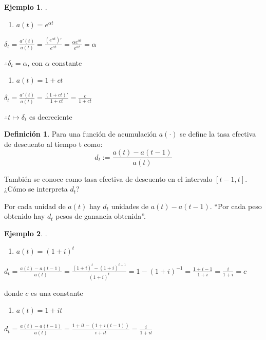 \documentclass[
]{book}
\providecommand{\tightlist}{%
  \setlength{\itemsep}{0pt}\setlength{\parskip}{0pt}}
\theoremstyle{definition}
\newtheorem{definition}{Definición}[chapter]
\theoremstyle{definition}
\newtheorem{example}{Ejemplo}[chapter]
\theoremstyle{definition}
\theoremstyle{definition}
\theoremstyle{remark}
\begin{document}
\begin{example}
.

\begin{enumerate}
\def\labelenumi{\arabic{enumi}.}
\tightlist
\item
  \(a(t)=e^{\alpha t}\)
\end{enumerate}

\(\delta_t = \frac{a'(t)}{a(t)} = \frac{\left( e^{\alpha t}\right)'}{e^{\alpha t}} = \frac{\alpha e^{\alpha t}}{e^{\alpha t}} = \alpha\)

\(\therefore \delta_t = \alpha\), con \(\alpha\) constante

\begin{enumerate}
\def\labelenumi{\arabic{enumi}.}
\setcounter{enumi}{1}
\tightlist
\item
  \(a(t) = 1+ct\)
\end{enumerate}

\(\delta_t = \frac{a'(t)}{a(t)} = \frac{\left( 1+ct\right)'}{1+ct} = \frac{c}{1+ct}\)

\(\therefore t\longmapsto \delta_t\) es decreciente
\end{example}

\begin{definition}
Para una función de acumulación \(a(\cdot )\) se define la {tasa efectiva de descuento al tiempo t} como:
\begin{equation*}
\boxed{d_t := \frac{a(t)-a(t-1)}{a(t)}}
\end{equation*}
\end{definition}

También se conoce como tasa efectiva de descuento en el intervalo \(\left[ t-1, t\right]\). ¿Cómo se interpreta \(d_t\)?

Por cada unidad de \(a(t)\) hay \(d_t\) unidades de \(a(t)-a(t-1)\). ``Por cada peso obtenido hay \(d_t\) pesos de ganancia obtenida''.

\begin{example}
.

\begin{enumerate}
\def\labelenumi{\arabic{enumi}.}
\tightlist
\item
  \(a(t) = (1+i)^t\)
\end{enumerate}

\(d_t = \frac{a(t) - a(t-1)}{a(t)} = \frac{(1+i)^t - (1+i)^{t-1}}{(1+i)^t} = 1 - (1+i)^{-1} = \frac{1+i-1}{1+i} = \frac{i}{1+i} = c\)

donde \(c\) es una constante

\begin{enumerate}
\def\labelenumi{\arabic{enumi}.}
\setcounter{enumi}{1}
\tightlist
\item
  \(a(t) = 1+it\)
\end{enumerate}

\(d_t = \frac{a(t) - a(t-1)}{a(t)} = \frac{1 + it - (1 + i(t - 1))}{i + it} = \frac{i}{1 + it}\)
\end{example}
\end{document}
